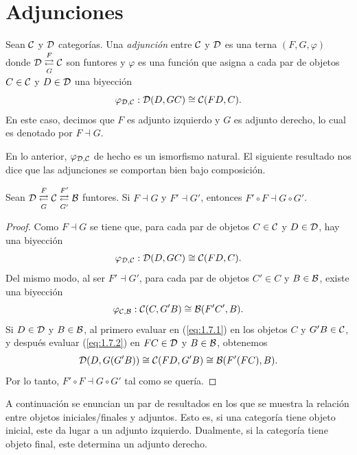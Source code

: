 \section{Adjunciones}
\begin{definition}[Adjunción]
Sean ${\mathcal C}$ y ${\mathcal D}$ categorías. Una \emph{adjunción} entre ${\mathcal C}$ y ${\mathcal D}$ es una terna $(F,G,\varphi)$ donde ${\mathcal D}\overset{F}{\underset{G}{\rightleftarrows}}{\mathcal C}$ son funtores y $\varphi$ es una función que asigna a cada par de objetos $C\in{\mathcal C}$ y $D\in{\mathcal D}$ una biyección
\begin{equation*}
\varphi_{{\mathcal D},{\mathcal C}}:{\mathcal D}(D,GC)\cong{\mathcal C}(FD,C).
\end{equation*}
En este caso, decimos  que $F$ es adjunto izquierdo y $G$ es adjunto derecho, lo cual es denotado por $F\dashv G$. 
\end{definition}
En lo anterior, $\varphi_{{\mathcal D},{\mathcal C}}$ de hecho es un ismorfismo natural. El siguiente resultado nos dice que las adjunciones se comportan bien bajo composición.
\begin{lema}
    Sean ${\mathcal D}\overset{F}{\underset{G}{\rightleftarrows}}{\mathcal C}\overset{F'}{\underset{G'}{\rightleftarrows}}{\mathcal B}$ funtores. Si $F\dashv G$ y $F'\dashv G'$, entonces $F'\circ F\dashv G\circ G'$.
\end{lema}
\begin{proof}
    Como $F\dashv G$ se tiene que, para cada par de objetos $C\in {\mathcal C}$ y $D\in {\mathcal D}$, hay una biyección 
    \begin{eqnarray}\label{eq:1.7.1}
        \varphi_{{\mathcal D},{\mathcal C}}:{\mathcal D}(D,GC)\cong{\mathcal C}(FD,C).
    \end{eqnarray}
    Del mismo modo, al ser $F'\dashv G'$, para cada par de objetos $C'\in C$ y $B\in {\mathcal B}$, existe una biyección
    \begin{equation}\label{eq:1.7.2}
        \varphi_{{\mathcal C},{\mathcal B}}:{\mathcal C}(C, G'B)\cong{\mathcal B}(F'C', B).
    \end{equation}
    Si $D\in {\mathcal D}$ y $B\in {\mathcal B}$, al primero evaluar en (\ref{eq:1.7.1}) en los objetos $C$ y $G'B\in {\mathcal C}$, y después evaluar (\ref{eq:1.7.2}) en $FC\in{\mathcal D}$ y $B\in {\mathcal B}$, obtenemos
    \begin{eqnarray*}
        {\mathcal D}(D,G(G'B))\cong {\mathcal C}(FD,G'B)\cong{\mathcal B}(F'(FC),B).
    \end{eqnarray*}
    Por lo tanto, $F'\circ F\dashv G\circ G'$ tal como se quería.
\end{proof}
A continuación se enuncian un par de resultados en los que se muestra la relación entre objetos iniciales/finales y adjuntos. Esto es, si una categoría tiene objeto inicial, este da lugar a un adjunto izquierdo. Dualmente, si la categoría tiene objeto  final, este determina un adjunto derecho.
